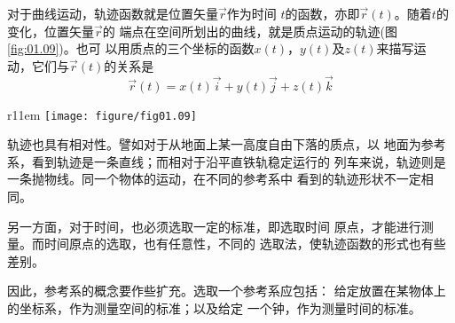 \documentclass[../outline-of-mechanics.tex]{subfiles}
\begin{document}
对于曲线运动，轨迹函数就是位置矢量$\vec{r}$作为时间
$t$的函数，亦即$\vec{r}\left(t\right)$。随着$t$的变化，位置矢量$\vec{r}$的
端点在空间所划出的曲线，就是质点运动的轨迹(图\ref{fig:01.09})。也可
以用质点的三个坐标的函数$x\left(t\right)$，$y\left(t\right)$及$z\left(t\right)$来描写运
动，它们与$\vec{r}\left(t\right)$的关系是
\clearpage
\begin{equation}\label{eqn:01.05.02}
  \vec{r}\left(t\right)=x\left(t\right)\vec{i}+y\left(t\right)\vec{j}+z\left(t\right)\vec{k}
\end{equation}

\begin{wrapfigure}[7]{r}{11em}
  \centering
  \texttt{[image: figure/fig01.09]}
  \caption{曲线运动}
  \label{fig:01.09}
\end{wrapfigure}
轨迹也具有相对性。譬如对于从地面上某一高度自由下落的质点，以
地面为参考系，看到轨迹是一条直线；而相对于沿平直铁轨稳定运行的
列车来说，轨迹则是一条抛物线。同一个物体的运动，在不同的参考系中
看到的轨迹形状不一定相同。

另一方面，对于时间，也必须选取一定的标准，即选取时间
原点，才能进行测量。而时间原点的选取，也有任意性，不同的
选取法，使轨迹函数的形式也有些差别。

因此，参考系的概念要作些扩充。选取一个参考系应包括：
给定放置在某物体上的坐标系，作为测量空间的标准；以及给定
一个钟，作为测量时间的标准。
\end{document}
